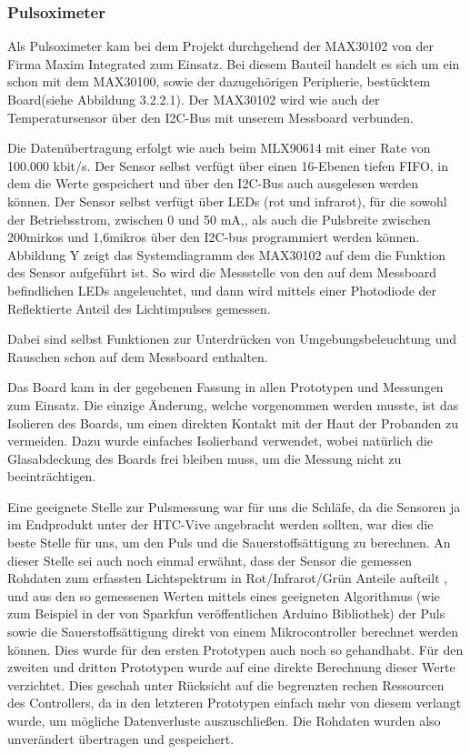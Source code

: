 \subsubsection{Pulsoximeter} \label{pulsoximeter-1}

Als Pulsoximeter kam bei dem Projekt durchgehend der MAX30102 von der Firma Maxim Integrated zum Einsatz. Bei diesem Bauteil handelt es sich um ein schon mit dem MAX30100, sowie der dazugehörigen Peripherie, bestücktem Board(siehe Abbildung 3.2.2.1). Der MAX30102 wird wie auch der Temperatursensor über den I2C-Bus mit unserem Messboard verbunden.


Die Datenübertragung erfolgt wie auch beim MLX90614 mit einer Rate von  100.000 kbit/s. Der Sensor selbst verfügt über einen 16-Ebenen tiefen FIFO, in dem die Werte gespeichert und über den I2C-Bus auch ausgelesen werden können. Der Sensor selbst verfügt über LEDs (rot und infrarot), für die sowohl der Betriebsstrom, zwischen 0 und 50 mA,, als auch die Pulsbreite zwischen 200mirkos und 1,6mikros über den I2C-bus programmiert werden können. Abbildung Y zeigt das Systemdiagramm des MAX30102 auf dem die Funktion des Sensor aufgeführt ist. So wird die Messstelle von den auf dem Messboard befindlichen LEDs angeleuchtet, und dann wird mittels einer Photodiode der Reflektierte Anteil des Lichtimpulses gemessen.


Dabei sind selbst Funktionen zur Unterdrücken von Umgebungsbeleuchtung und Rauschen schon auf dem Messboard enthalten.

Das Board kam in der gegebenen Fassung in allen Prototypen und Messungen zum Einsatz. Die einzige Änderung, welche vorgenommen werden musste, ist das Isolieren des Boards, um einen direkten Kontakt mit der Haut der Probanden zu vermeiden. Dazu wurde einfaches Isolierband verwendet, wobei natürlich die Glasabdeckung des Boards frei bleiben muss, um die Messung nicht zu beeinträchtigen.

Eine geeignete Stelle zur Pulsmessung war für uns die Schläfe, da die Sensoren ja im Endprodukt unter der HTC-Vive angebracht werden sollten, war dies die beste Stelle für uns, um den Puls und die Sauerstoffsättigung zu berechnen. An dieser Stelle sei auch noch einmal erwähnt, dass der Sensor die gemessen Rohdaten zum erfassten Lichtspektrum in Rot/Infrarot/Grün Anteile aufteilt , und aus den so gemessenen Werten mittels eines geeigneten Algorithmus (wie zum Beispiel in der von Sparkfun veröffentlichen Arduino Bibliothek) der Puls sowie die Sauerstoffsättigung direkt von einem Mikrocontroller berechnet werden können. Dies wurde für den ersten Prototypen auch noch so gehandhabt. Für den zweiten und dritten Prototypen wurde auf eine direkte Berechnung dieser Werte verzichtet. Dies geschah unter Rücksicht auf die begrenzten rechen Ressourcen des Controllers, da in den letzteren Prototypen einfach mehr von diesem verlangt wurde, um mögliche Datenverluste auszuschließen. Die Rohdaten wurden also unverändert übertragen und gespeichert.


